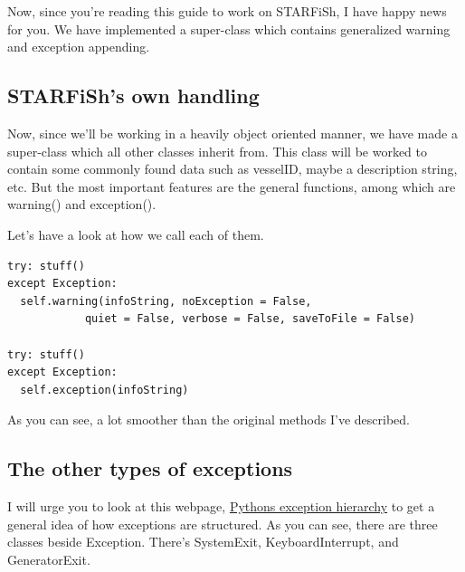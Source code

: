 \documentclass[10pt,a4paper]{article}
\begin{document}
Now, since you're reading this guide to work on STARFiSh, I have happy news for you. We have implemented a super-class which contains generalized warning and exception appending.

\subsection{STARFiSh's own handling}

Now, since we'll be working in a heavily object oriented manner, we have made a super-class which all other classes inherit from. This class will be worked to contain some commonly found data such as vesselID, maybe a description string, etc. But the most important features are the general functions, among which are warning() and exception().

Let's have a look at how we call each of them.

\begin{lstlisting}
try: stuff()
except Exception:
  self.warning(infoString, noException = False, 
            quiet = False, verbose = False, saveToFile = False)

try: stuff()
except Exception:
  self.exception(infoString)
\end{lstlisting}

As you can see, a lot smoother than the original methods I've described.

\subsection{The other types of exceptions}

I will urge you to look at this webpage, \href{https://docs.python.org/2/library/exceptions.html\#exception-hierarchy}{Pythons exception hierarchy} to get a general idea of how exceptions are structured. As you can see, there are three classes beside Exception. There's SystemExit, KeyboardInterrupt, and GeneratorExit. 
\end{document}
